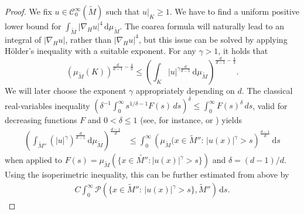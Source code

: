\documentclass[10pt,letterpaper]{amsart}
\theoremstyle{definition}
\numberwithin{thm}{subsection}
\numberwithin{equation}{section}
\begin{document}
\begin{proof}

We fix $u\in \mathcal{C}^{\infty}_0(\widetilde{M})$ such that $u|_K \geq 1$. We have to find a uniform positive lower bound for $\int_{\widetilde{M}} |\nabla_H u|^4 \,\mathrm{d}\mu_{\widetilde{M}}$. The coarea formula will naturally lead to an integral of $|\nabla_H u|$, rather than $|\nabla_H u|^4$, but this issue can be solved by applying H\"older's inequality with a suitable exponent.
For any $\gamma>1$, it holds that
\begin{equation}\label{eq:estK}
\left(\mu_{\widetilde{M}}(K) \right)^{\frac{d}{d-1}-\frac{4}{3}}\leq \left(\int_K |u|^{\gamma \frac{d}{d-1}}\,\mathrm{d}\mu_{\widetilde{M}}\right)^{\frac{d}{d-1}-\frac{4}{3}}.
\end{equation}
We will later choose the exponent $\gamma$ appropriately depending on $d$.
The classical real-variables inequality $\left( \delta^{-1} \int_0^\infty s^{1/\delta-1} F(s) \, ds \right)^\delta\leq \int_0^\infty F(s)^\delta \, ds $, valid for decreasing functions $F$ and $0<\delta\le 1$ (see, for instance, \cite[(3.34)]{MR1800917} or \cite[(II.2.2)]{MR1849187}) yields
\begin{align*}
\left(\int_{\widetilde{M}''}
\left(|u|^{\gamma}\right)^{\frac{d}{d-1}}\,\mathrm{d}\mu_{\widetilde{M}}\right)^{\frac{d-1}{d}}&\leq
\int_0^{\infty} \left(\mu_{\widetilde{M}}(x\in \widetilde{M}'':\,
|u(x)|^{\gamma}> s\right)^{\frac{d-1}{d}}\,\mathrm{d}s
\end{align*}
when applied to $F(s) = \mu_{\widetilde{M}}(\{x \in \widetilde{M''}:|u(x)|^\gamma>s\})$ and $\delta = (d-1)/d$.
Using the isoperimetric inequality, this can be further estimated from above by
\begin{align*}
C \int_0^{\infty} \mathcal{P}(\{x\in \widetilde{M}'':\, |u(x)|^{\gamma}>s\},\widetilde{M}'')\,\mathrm{d}s.
\end{align*}


\end{proof}
\end{document}
